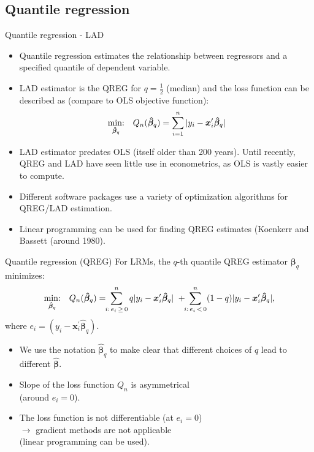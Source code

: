\documentclass{beamer}
\begin{document}
\subsection{Quantile regression}
\begin{frame}{Quantile regression - LAD}
\begin{itemize}
\item Quantile regression estimates the relationship between regressors and a specified quantile of dependent variable.
\smallskip
\item LAD estimator is the QREG for $q=\tfrac{1}{2}$ (median) and the loss function can be described as (compare to OLS objective function): $$
\underset{\bm{\hat{\beta}}_{q}}{\textnormal{min:}} \quad Q_n(\bm{\hat{\beta}}_{q}) =
\sum_{i=1}^n |y_i-\bm{x}_i^{\prime}\bm{\hat{\beta}}_{q}|
$$
\item LAD estimator predates OLS (itself older than 200 years). Until recently, QREG and LAD have seen little use in econometrics, as OLS is vastly easier to compute.
\item Different software packages use a variety of optimization algorithms for QREG/LAD estimation.
\item Linear programming can be used for finding QREG estimates (Koenkerr and Bassett (around 1980).
\end{itemize}
\end{frame}
\begin{frame}{Quantile regression (QREG)}
For LRMs, the $q$-th quantile QREG estimator $\bm{\beta}_q$ minimizes:
$$
\underset{\bm{\hat{\beta}}_q}{\textnormal{min:}} \quad Q_n(\bm{\hat{\beta}}_q) =
\! \! \sum^n_{i:\, e_i \, \geq \, 0} q|y_i - \bm{x}_i^{\prime}\bm{\hat{\beta}}_q| \,\, +
\! \! \sum^n_{i:\, e_i\, < \, 0} (1-q)|y_i - \bm{x}_i^{\prime}\bm{\hat{\beta}}_q|,
$$
where $e_i = (y_i - \bm{x}_i^{\prime}\bm{\hat{\beta}}_q)$.

\begin{itemize}
    \item We use the notation $\bm{\hat{\beta}}_q$ to make clear that different choices of $q$ lead to different  $\bm{\hat{\beta}}$.
    \item Slope of the loss function $Q_n$ is asymmetrical \\(around $e_i=0$).
    \item The loss function is not differentiable (at $e_i=0$) \\$\rightarrow$ gradient methods are not applicable \\(linear programming can be used).
\end{itemize}
\end{frame}
\end{document}
